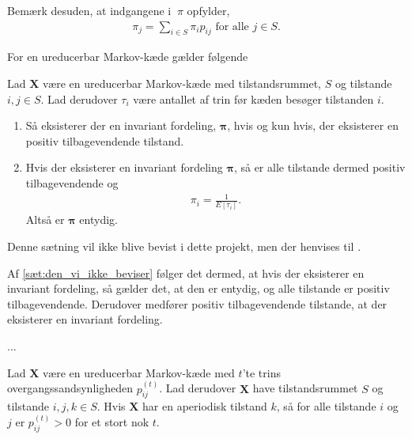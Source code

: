 Bemærk desuden, at indgangene i $\bm\ \pi$ opfylder,
\begin{align}\label{eq:sum_invariant_fordeling}
     \pi_j=\sum_{i\in S}\pi_ip_{ij} \text{ for alle } j\in S. 
\end{align}

For en ureducerbar Markov-kæde gælder følgende

\begin{minipage}\textwidth
\begin{thmx} \label{sæt:den_vi_ikke_beviser}\textbf{} %
\newline
Lad $\bm X$ være en ureducerbar Markov-kæde med tilstandsrummet, $S$ og tilstande $i, j\in S$. Lad derudover $\tau_i$ være antallet af trin før kæden besøger tilstanden $i$.
\begin{enumerate}
    \item Så eksisterer der en invariant fordeling, $\bm \pi$, hvis og kun hvis, der eksisterer en positiv tilbagevendende tilstand.
    \item Hvis der eksisterer en invariant fordeling $\bm \pi$, så er alle tilstande dermed positiv tilbagevendende og 
    \begin{align*}
        \pi_i = \frac{1}{E[\tau_i]}.
    \end{align*}
    Altså er $\bm\pi$ entydig. 
\end{enumerate}
\end{thmx}
\end{minipage}
Denne sætning vil ikke blive bevist i dette projekt, men der henvises til \citep[s. 233-234]{oxford}. 

Af \autoref{sæt:den_vi_ikke_beviser} følger det dermed, at hvis der eksisterer en invariant fordeling, så gælder det, at den er entydig, og alle tilstande er positiv tilbagevendende. Derudover medfører positiv tilbagevendende tilstande, at der eksisterer en invariant fordeling. 

...

\begin{minipage}\textwidth
\begin{lem} \label{lem:lort}\textbf{} %
\newline
Lad $\bm X$ være en ureducerbar Markov-kæde med $t$'te trins overgangssandsynligheden $p_{ij}^{(t)}$. Lad derudover $\bm X$ have tilstandsrummet $S$ og tilstande $i, j, k \in S$. Hvis $\bm X$ har en aperiodisk tilstand $k$, så for alle tilstande $i$ og $j$ er $p_{ij}^{(t)}>0$ for et stort nok $t$. 
\end{lem}
\end{minipage}

